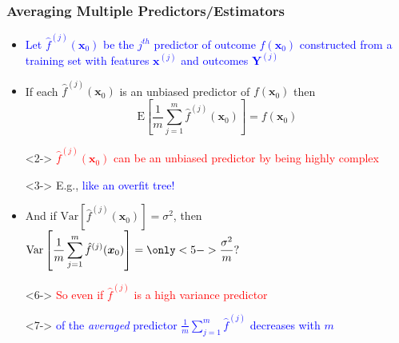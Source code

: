 \documentclass[xcolor={dvipsnames}]{beamer}
\begin{document}
\frame
{
\frametitle{Averaging Multiple Predictors/Estimators}

\begin{itemize}
\item<1-> \textcolor{blue}{Let $\hat f^{(j)}({\boldsymbol x}_0)$ be the $j^{th}$ predictor of outcome $f({\boldsymbol x}_0)$ constructed 
from a training set with features ${\boldsymbol x}^{(j)}$ and outcomes ${\boldsymbol Y}^{(j)}$}
\item[]
\item<1-> If each $\hat f^{(j)}({\boldsymbol x}_0)$ is an unbiased predictor of $f({\boldsymbol x}_0)$ then
$$\text{E}\left[\frac{1}{m} \sum_{j=1}^m \hat f^{(j)}({\boldsymbol x}_0)\right] = f({\boldsymbol x}_0)$$
\item[]<2-> \textcolor{red}{$\hat f^{(j)}({\boldsymbol x}_0)$ can be an unbiased predictor by being highly complex}
\item[]<3-> E.g., \textcolor{blue}{like an overfit tree!}
\item<4-> And if $\text{Var}\left[\hat f^{(j)}({\boldsymbol x}_0)\right] = \sigma^2$, then  
$\displaystyle \text{Var}\left[\frac{1}{m} \sum_{j=1}^m \hat f^{(j)}({\boldsymbol x}_0)\right] = \only<5->{\frac{\sigma^2}{m}}\text{?}$
\item[]<6-> \textcolor{red}{So even if $\hat f^{(j)}$ is a high variance predictor} 
\item[]<7-> \textcolor{blue}{of the \emph{averaged} predictor $\frac{1}{m} \sum_{j=1}^m \hat f^{(j)}$ decreases with $m$} 

\end{itemize}

}
\end{document}
